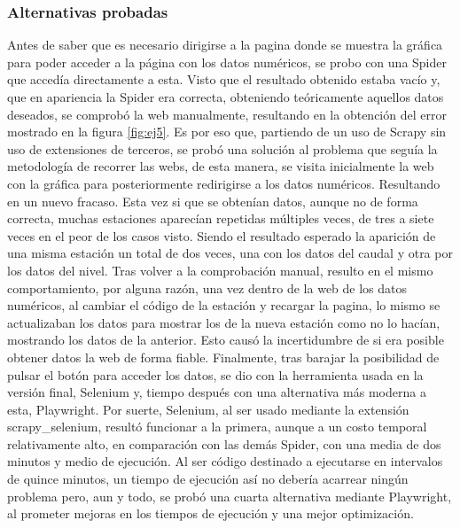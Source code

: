 \subsubsection{Alternativas probadas}
Antes de saber que es necesario dirigirse a la pagina donde se muestra la gráfica para poder acceder a la página con los datos numéricos, se probo con una Spider que accedía directamente a esta. Visto que el resultado obtenido estaba vacío y, que en apariencia la Spider era correcta, obteniendo teóricamente aquellos datos deseados, se comprobó la web manualmente, resultando en la obtención del error mostrado en la figura \ref{fig:ej5}.\newline
\newline
Es por eso que, partiendo de un uso de Scrapy sin uso de extensiones de terceros, se probó una solución al problema que seguía la metodología de recorrer las webs, de esta manera, se visita inicialmente la web con la gráfica para posteriormente redirigirse a los datos numéricos. Resultando en un nuevo fracaso.\newline
\newline
Esta vez si que se obtenían datos, aunque no de forma correcta, muchas estaciones aparecían repetidas múltiples veces, de tres a siete veces en el peor de los casos visto. Siendo el resultado esperado la aparición de una misma estación un total de dos veces, una con los datos del caudal y otra por los datos del nivel. Tras volver a la comprobación manual, resulto en el mismo comportamiento, por alguna razón, una vez dentro de la web de los datos numéricos, al cambiar el código de la estación y recargar la pagina, lo mismo se actualizaban los datos para mostrar los de la nueva estación como no lo hacían, mostrando los datos de la anterior.\newline
\newline
Esto causó la incertidumbre de si era posible obtener datos la web de forma fiable. Finalmente, tras barajar la posibilidad de pulsar el botón para acceder los datos, se dio con la herramienta usada en la versión final, Selenium y, tiempo después con una alternativa más moderna a esta, Playwright.\newline
\newline
Por suerte, Selenium, al ser usado mediante la extensión scrapy\_selenium, resultó funcionar a la primera, aunque a un costo temporal relativamente alto, en comparación con las demás Spider, con una media de dos minutos y medio de ejecución.\newline
\newline
Al ser código destinado a ejecutarse en intervalos de quince minutos, un tiempo de ejecución así no debería acarrear ningún problema pero, aun y todo, se probó una cuarta alternativa mediante Playwright, al prometer mejoras en los tiempos de ejecución y una mejor optimización.\newline
\newline

